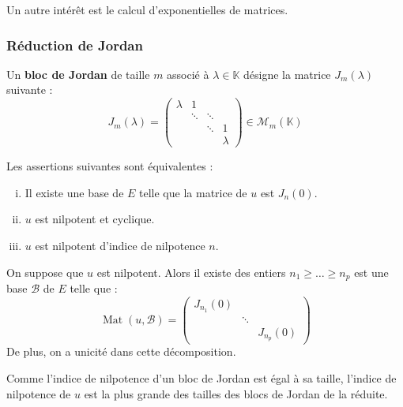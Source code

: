 	\begin{remark}
		Un autre intérêt est le calcul d'exponentielles de matrices.
	\end{remark}
	
	\subsubsection{Réduction de Jordan}
	
	
	\begin{definition}
		Un \textbf{bloc de Jordan} de taille $m$ associé à $\lambda \in \mathbb{K}$ désigne la matrice $J_m(\lambda)$ suivante :
		\[ J_m(\lambda) = \begin{pmatrix} \lambda & 1 & \\ & \ddots & \ddots & \\ & & \ddots & 1 \\ & & & \lambda \end{pmatrix} \in \mathcal{M}_m(\mathbb{K}) \]
	\end{definition}
	
	\begin{proposition}
		Les assertions suivantes sont équivalentes :
		\begin{enumerate}[(i)]
			\item Il existe une base de $E$ telle que la matrice de $u$ est $J_n(0)$.
			\item $u$ est nilpotent et cyclique.
			\item $u$ est nilpotent d'indice de nilpotence $n$.
		\end{enumerate}
	\end{proposition}
	
	\begin{theorem}
		On suppose que $u$ est nilpotent. Alors il existe des entiers $n_1 \geq \dots \geq n_p$ est une base $\mathcal{B}$ de $E$ telle que :
		\[ \operatorname{Mat}(u, \mathcal{B}) = \begin{pmatrix} J_{n_1}(0) & & \\ & \ddots & \\ & & J_{n_p}(0) \end{pmatrix} \]
		De plus, on a unicité dans cette décomposition.
	\end{theorem}
	
	\begin{remark}
		Comme l'indice de nilpotence d'un bloc de Jordan est égal à sa taille, l'indice de nilpotence de $u$ est la plus grande des tailles des blocs de Jordan de la réduite.
	\end{remark}
	
